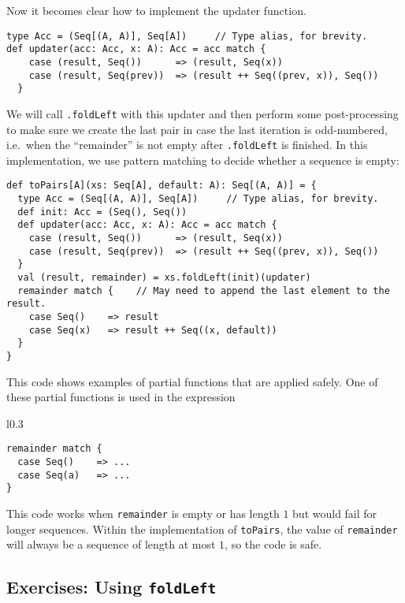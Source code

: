 Now it becomes clear how to implement the updater function.
\begin{lstlisting}
type Acc = (Seq[(A, A)], Seq[A])     // Type alias, for brevity.
def updater(acc: Acc, x: A): Acc = acc match {
    case (result, Seq())      => (result, Seq(x))
    case (result, Seq(prev))  => (result ++ Seq((prev, x)), Seq())
  }
\end{lstlisting}
We will call \lstinline!.foldLeft! with this updater and then perform
some post-processing to make sure we create the last pair in case
the last iteration is odd-numbered, i.e.~when the ``remainder''
is not empty after \lstinline!.foldLeft! is finished. In this implementation,
we use pattern matching to decide whether a sequence is empty:
\begin{lstlisting}
def toPairs[A](xs: Seq[A], default: A): Seq[(A, A)] = {
  type Acc = (Seq[(A, A)], Seq[A])     // Type alias, for brevity.
  def init: Acc = (Seq(), Seq())
  def updater(acc: Acc, x: A): Acc = acc match {
    case (result, Seq())      => (result, Seq(x))
    case (result, Seq(prev))  => (result ++ Seq((prev, x)), Seq())
  }
  val (result, remainder) = xs.foldLeft(init)(updater)
  remainder match {    // May need to append the last element to the result.
    case Seq()    => result
    case Seq(x)   => result ++ Seq((x, default))
  }
}
\end{lstlisting}
This code shows examples of partial functions that are applied safely.
One of these partial functions is used in the expression

\begin{wrapfigure}{l}{0.3\columnwidth}%
\vspace{-0.75\baselineskip}
\begin{lstlisting}
remainder match {
  case Seq()    => ...
  case Seq(a)   => ...
}
\end{lstlisting}

\vspace{-1.5\baselineskip}
\end{wrapfigure}%

\noindent This code works when \lstinline!remainder! is empty or
has length $1$ but would fail for longer sequences. Within the implementation
of \lstinline!toPairs!, the value of \lstinline!remainder! will
always be a sequence of length at most $1$, so the code is safe.

\subsection{Exercises: Using \texttt{foldLeft}}

